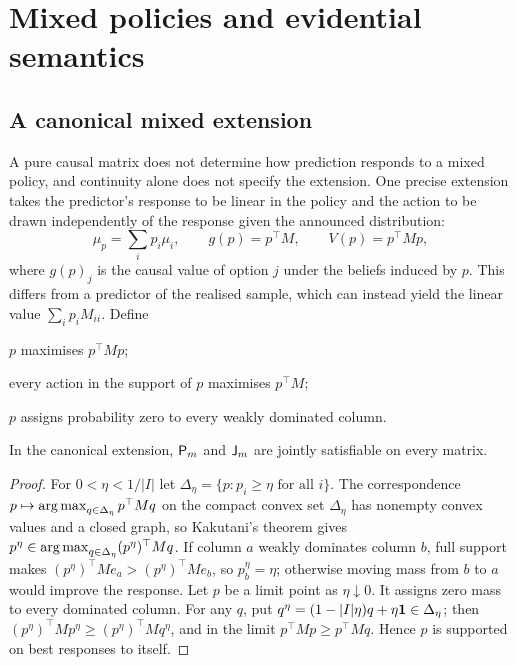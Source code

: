 \section{Mixed policies and evidential semantics}\label{sec:mixed}

\subsection{A canonical mixed extension}

A pure causal matrix does not determine how prediction responds to a mixed policy, and continuity
alone does not specify the extension. One precise extension takes the predictor's response to be
linear in the policy and the action to be drawn independently of the response given the announced
distribution:
\[
  \mu_p=\sum_ip_i\mu_i,\qquad g(p)=p^\top M,\qquad V(p)=p^\top Mp ,
\]
where $g(p)_j$ is the causal value of option $j$ under the beliefs induced by $p$. This differs from
a predictor of the realised sample, which can instead yield the linear value $\sum_ip_iM_{ii}$. Define
\begin{description}[font=\normalfont,leftmargin=2.4em,labelwidth=1.6em,labelsep=.8em,itemsep=.35em]
  \item[$\ax{D}_m$] $p$ maximises $p^\top Mp$;
  \item[$\ax{J}_m$] every action in the support of $p$ maximises $p^\top M$;
  \item[$\ax{P}_m$] $p$ assigns probability zero to every weakly dominated column.
\end{description}

\begin{proposition}\label{prop:mixedPJ}
In the canonical extension, $\ax{P}_m$ and $\ax{J}_m$ are jointly satisfiable on every matrix.
\end{proposition}

\begin{proof}
For $0<\eta<1/|I|$ let $\Delta_\eta=\{p:p_i\ge\eta\text{ for all }i\}$. The correspondence
$p\mapsto\operatorname*{arg\,max}_{q\in\Delta_\eta}p^\top Mq$ on the compact convex set $\Delta_\eta$ has nonempty convex
values and a closed graph, so Kakutani's theorem gives
$p^\eta\in\operatorname*{arg\,max}_{q\in\Delta_\eta}(p^\eta)^\top Mq$. If column $a$ weakly dominates column $b$, full support
makes $(p^\eta)^\top Me_a>(p^\eta)^\top Me_b$, so $p^\eta_b=\eta$; otherwise moving mass from $b$ to $a$ would
improve the response. Let $p$ be a limit point as $\eta\downarrow0$. It assigns zero mass to every
dominated column. For any $q$, put $q^\eta=(1-|I|\eta)q+\eta\mathbf{1}\in\Delta_\eta$; then
$(p^\eta)^\top Mp^\eta\ge(p^\eta)^\top Mq^\eta$, and in the limit $p^\top Mp\ge p^\top Mq$. Hence $p$ is supported on
best responses to itself.
\end{proof}

